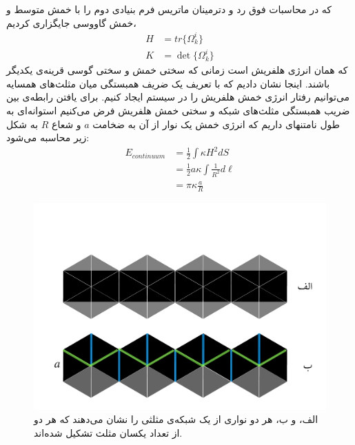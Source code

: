 که در محاسبات فوق رد
 و دترمینان ماتریس فرم بنیادی دوم را با خمش متوسط و خمش گاووسی جایگزاری کردیم،
\begin{equation}
\begin{aligned}
H&=tr\{\Omega_k^i\}\\
K&=\det\{\Omega_k^i\}
\end{aligned}
\end{equation} 
که همان انرژی هلفریش است زمانی که سختی خمش و سختی گوسی قرینه‌ی یکدیگر باشند. اینجا نشان دادیم که با تعریف یک ضریف همبستگی میان مثلث‌های همسایه می‌توانیم رفتار انرژی خمش هلفریش را در سیستم ایجاد کنیم. برای یافتن رابطه‌ی بین ضریب همبستگی مثلث‌های شبکه و سختی خمش هلفریش فرض می‌کنیم استوانه‌ای به طول نامتنهای داریم که انرژی خمش یک نوار از آن به ضخامت
$a$
و شعاع
$R$
به شکل زیر محاسبه می‌شود:
\begin{equation}
\begin{aligned}
E_{continuum}&=\frac{1}{2}\int \kappa H^2dS \\
&=\frac{1}{2}a\kappa\int \frac{1}{R^2}d\ell \\
&=\pi\kappa\frac{a}{R}
\end{aligned}
\label{eq:cylindercontinuum}
\end{equation} 

\begin{figure}[h]
\begin{center}
\includegraphics[width=6in]{Figs/cylindermesh.pages.pdf}
\caption{
الف، و ب، هر دو نواری از یک شبکه‌ی مثلثی را نشان می‌دهند که هر دو از تعداد یکسان مثلث تشکیل شده‌اند. 
}
\label{fig:cylindermesh}
\end{center}
\end{figure}



